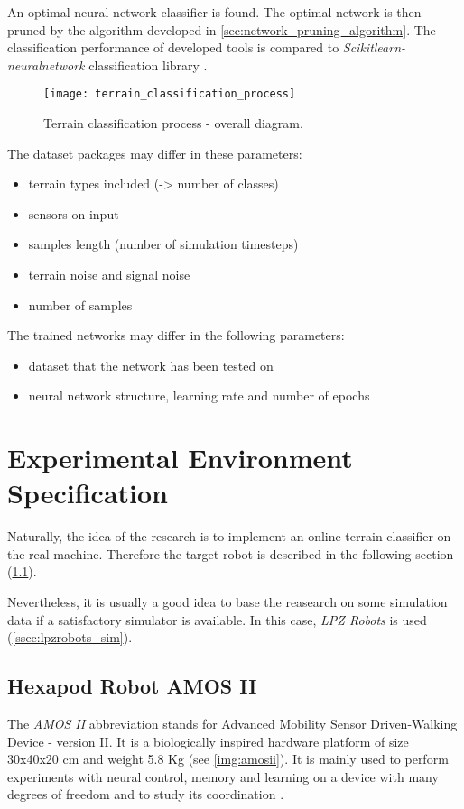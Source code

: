 An optimal neural network classifier is found. The optimal network is then pruned by the algorithm developed in \cref{sec:network_pruning_algorithm}. The classification performance of developed tools is compared to \textit{Scikitlearn-neuralnetwork} classification library \citep{misc:sknn}.

\begin{figure}[H]
  \centering
  \texttt{[image: terrain\_classification\_process]}
  \caption{Terrain classification process - overall diagram.}
  \label{img:terrain_classification_process}
\end{figure}

The dataset packages may differ in these parameters:
\begin{itemize}
\item terrain types included (-> number of classes)
\item sensors on input
\item samples length (number of simulation timesteps)
\item terrain noise and signal noise
\item number of samples
\end{itemize}

The trained networks may differ in the following parameters:
\begin{itemize}
\item dataset that the network has been tested on
\item neural network structure, learning rate and number of epochs
\end{itemize}

\section{Experimental Environment Specification}
Naturally, the idea of the research is to implement an online terrain classifier on the real machine. Therefore the target robot is described in the following section (\ref{ssec:amosii}).

Nevertheless, it is usually a good idea to base the reasearch on some simulation data if a satisfactory simulator is available. In this case, \textit{LPZ Robots} \citep{misc:lpzrobots} is used (\cref{ssec:lpzrobots_sim}).

\subsection{Hexapod Robot AMOS II} \label{ssec:amosii}
The \textit{AMOS II} abbreviation stands for Advanced Mobility Sensor Driven-Walking Device - version II. It is a biologically inspired hardware platform of size 30x40x20 cm and weight 5.8 Kg (see \cref{img:amosii}). It is mainly used to perform experiments with neural control, memory and learning on a device with many degrees of freedom and to study its coordination \citep{misc:amosii}.

